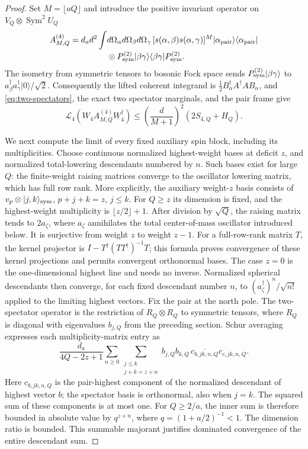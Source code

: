 \documentclass[11pt]{article}
\newcommand{\Sym}{\operatorname{Sym}}
\begin{document}
\begin{proof}
Set $M=\lfloor aQ\rfloor$ and introduce the positive invariant operator
on $V_Q\otimes\Sym^2U_Q$
\begin{align}
 A^{(4)}_{M,Q}=d_ad^2\int &d\Omega_\alpha d\Omega_\beta d\Omega_\gamma\,
 [s(\alpha,\beta)s(\alpha,\gamma)]^M
 |\alpha_{\rm pair}\rangle\langle\alpha_{\rm pair}|\notag\\[-2pt]
 &\otimes P_{\rm sym}^{(2)}|\beta\gamma\rangle
       \langle\beta\gamma|P_{\rm sym}^{(2)}.
\end{align}
The isometry from symmetric tensors to bosonic Fock space sends
$P_{\rm sym}^{(2)}|\beta\gamma\rangle$ to
$a_\beta^\dagger a_\gamma^\dagger|0\rangle/\sqrt2$.
Consequently the lifted coherent integrand is
$\tfrac12B_\alpha^\dagger A^\dagger A B_\alpha$, and
\eqref{eq:two-spectators}, the exact two spectator marginals, and the pair
frame give
\begin{equation}\label{eq:four-kernel-lift}
 \mathcal L_4(W_4A^{(4)}_{M,Q}W_4^\dagger)
 \le\left(\frac{d}{M+1}\right)^2(2S_{4,Q}+H_Q).
\end{equation}

We next compute the limit of every fixed auxiliary spin block, including
its multiplicities. Choose continuous normalized highest-weight bases at
deficit $z$, and normalized total-lowering descendants numbered by $n$.
Such bases exist for large $Q$: the finite-weight raising matrices converge
to the oscillator lowering matrix, which has full row rank. More explicitly,
the auxiliary weight-$z$ basis consists of $v_p\otimes|j,k\rangle_{\rm sym}$,
$p+j+k=z$, $j\le k$. For $Q\ge z$ its dimension is fixed, and the
highest-weight multiplicity is $\lfloor z/2\rfloor+1$. After division by
$\sqrt Q$, the raising matrix tends to $2a_\zeta$, where $a_\zeta$ annihilates
the total center-of-mass oscillator introduced below. It is surjective from
weight $z$ to weight $z-1$. For a full-row-rank matrix $T$, the kernel
projector is $I-T^\dagger(TT^\dagger)^{-1}T$; this formula proves convergence
of these kernel projections and permits convergent orthonormal bases.
The case $z=0$ is the one-dimensional highest line and needs no inverse.
Normalized spherical descendants then converge, for each fixed descendant
number $n$, to $(a_\zeta^\dagger)^n/\sqrt{n!}$ applied to the limiting
highest vectors.
Fix the pair at the north pole. The two-spectator operator is the restriction of
$R_Q\otimes R_Q$ to symmetric tensors, where $R_Q$ is diagonal with
eigenvalues $b_{j,Q}$ from the preceding section. Schur averaging expresses
each multiplicity-matrix entry as
\begin{equation}
 \frac{d_a}{4Q-2z+1}\sum_{n\ge0}
 \sum_{\substack{j\le k\\j+k=z+n}}
 b_{j,Q}b_{k,Q}\,\overline{c_{b,jk,n,Q}}c_{c,jk,n,Q}.
\end{equation}
Here $c_{b,jk,n,Q}$ is the pair-highest component of the normalized
descendant of highest vector $b$; the spectator basis is orthonormal, also
when $j=k$. The squared sum of these components is at most one. For
$Q\ge2/a$, the inner sum is therefore bounded in absolute value by
$q^{z+n}$, where $q=(1+a/2)^{-1}<1$. The dimension ratio is bounded.
This summable majorant justifies dominated convergence of the entire
descendant sum.


\end{proof}
\end{document}
